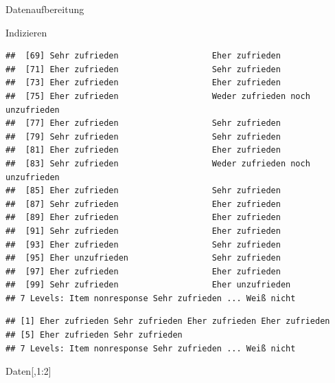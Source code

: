 \documentclass[ignorenonframetext,]{beamer}
\newenvironment{Shaded}{}{}
\newcommand{\DecValTok}[1]{\textcolor[rgb]{0.25,0.63,0.44}{{#1}}}
\newcommand{\NormalTok}[1]{{#1}}
\begin{document}
\begin{frame}[fragile]{Datenaufbereitung}
\begin{block}{Indizieren}
\begin{verbatim}
##  [69] Sehr zufrieden                   Eher zufrieden                  
##  [71] Eher zufrieden                   Sehr zufrieden                  
##  [73] Eher zufrieden                   Eher zufrieden                  
##  [75] Eher zufrieden                   Weder zufrieden noch unzufrieden
##  [77] Eher zufrieden                   Sehr zufrieden                  
##  [79] Sehr zufrieden                   Sehr zufrieden                  
##  [81] Eher zufrieden                   Eher zufrieden                  
##  [83] Sehr zufrieden                   Weder zufrieden noch unzufrieden
##  [85] Eher zufrieden                   Sehr zufrieden                  
##  [87] Sehr zufrieden                   Eher zufrieden                  
##  [89] Eher zufrieden                   Eher zufrieden                  
##  [91] Sehr zufrieden                   Eher zufrieden                  
##  [93] Eher zufrieden                   Sehr zufrieden                  
##  [95] Eher unzufrieden                 Sehr zufrieden                  
##  [97] Eher zufrieden                   Eher zufrieden                  
##  [99] Sehr zufrieden                   Eher unzufrieden                
## 7 Levels: Item nonresponse Sehr zufrieden ... Weiß nicht
\end{verbatim}

\begin{verbatim}
## [1] Eher zufrieden Sehr zufrieden Eher zufrieden Eher zufrieden
## [5] Eher zufrieden Sehr zufrieden
## 7 Levels: Item nonresponse Sehr zufrieden ... Weiß nicht
\end{verbatim}

\begin{Shaded}
\begin{Highlighting}[]
\NormalTok{Daten[,}\DecValTok{1}\NormalTok{:}\DecValTok{2}\NormalTok{]}
\end{Highlighting}
\end{Shaded}


\end{block}
\end{frame}
\end{document}
